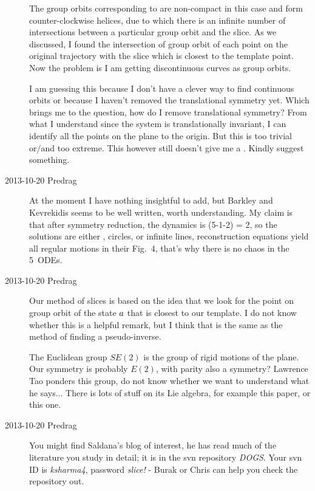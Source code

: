 \begin{description}
The group orbits corresponding to  are non-compact in this
case and form counter-clockwise helices, due to which there is an
infinite number of intersections between a particular group orbit and
the slice. As we discussed, I found the intersection of group orbit
of each point on the original trajectory with the slice which is
closest to the template point. Now the problem is I am getting
discontinuous curves as group orbits.



I am guessing this because I don't have a clever way to find
continuous orbits or because I haven't removed the translational
symmetry yet. Which brings me to the question, how do I remove
translational symmetry? From what I understand since the system is
translationally invariant, I can identify all the points on the plane
to the origin. But this is too trivial or/and too extreme. This
however still doesn't give me a \rpo.
Kindly suggest something.


\item[2013-10-20 Predrag] At the moment I have nothing insightful to add,
but Barkley and Kevrekidis seems to be well written, worth
understanding. My claim is that after symmetry reduction, the dynamics is
(5-1-2) = 2\dmn, so the solutions are either \eqva, circles, or infinite
lines, reconstruction equations yield all regular motions in
their Fig.~4, that's why there is no chaos in the 5\dmn\ ODEs.

\item[2013-10-20 Predrag] Our method of slices is based on the idea that
we look for the point on group orbit of the state $a$ that is closest
to our template. I do not know whether this is a helpful remark, but
I think that is the same as the method of finding a
{pseudo-inverse}.

The Euclidean group $SE(2)$ is the group of rigid motions of the plane.
Our symmetry is probably $E(2)$, with parity also a symmetry? Lawrence Tao
ponders
{this group}, do not know whether we want to understand what he says...
There is lots of stuff on its Lie algebra, for example
{this paper}, or
{this one}.

\item[2013-10-20 Predrag] You might find Saldana's blog of interest, he
has read much of the literature you study in detail; it is
in the svn repository \emph{DOGS}. Your svn ID is \emph{ksharma4},
password \emph{slice!} - Burak or Chris can help you check the repository
out.


\end{description}
